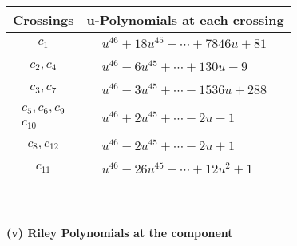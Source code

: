 \documentclass[1p]{elsarticle_modified}
\theoremstyle{definition}
\begin{document}
\begin{tabular}{m{50pt}|m{274pt}}
Crossings & \hspace{64pt}u-Polynomials at each crossing \\
\hline $$\begin{aligned}c_{1}\end{aligned}$$&$\begin{aligned}
&u^{46}+18 u^{45}+\cdots+7846 u+81
\end{aligned}$\\
\hline $$\begin{aligned}c_{2},c_{4}\end{aligned}$$&$\begin{aligned}
&u^{46}-6 u^{45}+\cdots+130 u-9
\end{aligned}$\\
\hline $$\begin{aligned}c_{3},c_{7}\end{aligned}$$&$\begin{aligned}
&u^{46}-3 u^{45}+\cdots-1536 u+288
\end{aligned}$\\
\hline $$\begin{aligned}c_{5},c_{6},c_{9}\\c_{10}\end{aligned}$$&$\begin{aligned}
&u^{46}+2 u^{45}+\cdots-2 u-1
\end{aligned}$\\
\hline $$\begin{aligned}c_{8},c_{12}\end{aligned}$$&$\begin{aligned}
&u^{46}-2 u^{45}+\cdots-2 u+1
\end{aligned}$\\
\hline $$\begin{aligned}c_{11}\end{aligned}$$&$\begin{aligned}
&u^{46}-26 u^{45}+\cdots+12 u^2+1
\end{aligned}$\\
\hline
\end{tabular}\\~\\
\newpage\renewcommand{\arraystretch}{1}
\flushleft \textbf{(v) Riley Polynomials at the component}\newline \\
\end{document}
